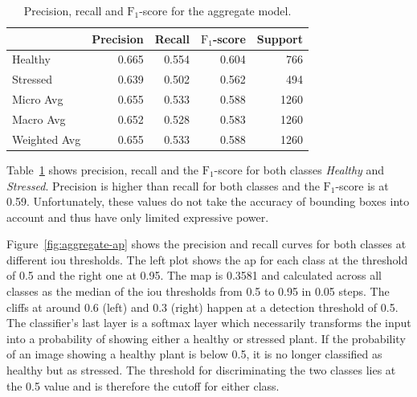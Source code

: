 \documentclass[final]{vutinfth} %
\begin{document}
\begin{table}
  \centering
  \begin{tabular}{lrrrr}
    \toprule
    {} &  Precision &  Recall &  $\mathrm{F}_{1}$-score &  Support \\
    \midrule
    Healthy      &      \num{0.665} &   \num{0.554} &     \num{0.604} &    \num{766} \\
    Stressed     &      \num{0.639} &   \num{0.502} &     \num{0.562} &    \num{494} \\
    Micro Avg    &      \num{0.655} &   \num{0.533} &     \num{0.588} &   \num{1260} \\
    Macro Avg    &      \num{0.652} &   \num{0.528} &     \num{0.583} &   \num{1260} \\
    Weighted Avg &      \num{0.655} &   \num{0.533} &     \num{0.588} &   \num{1260} \\
    \bottomrule
  \end{tabular}
  \caption{Precision, recall and $\mathrm{F}_1$-score for the
    aggregate model.}
  \label{tab:model-metrics}
\end{table}

Table~\ref{tab:model-metrics} shows precision, recall and the
$\mathrm{F}_1$-score for both classes \emph{Healthy} and
\emph{Stressed}. Precision is higher than recall for both classes and
the $\mathrm{F}_1$-score is at \num{0.59}. Unfortunately, these values
do not take the accuracy of bounding boxes into account and thus have
only limited expressive power.

Figure~\ref{fig:aggregate-ap} shows the precision and recall curves
for both classes at different \gls{iou} thresholds. The left plot
shows the \gls{ap} for each class at the threshold of \num{0.5} and
the right one at \num{0.95}. The \gls{map} is \num{0.3581} and
calculated across all classes as the median of the \gls{iou}
thresholds from \num{0.5} to \num{0.95} in \num{0.05} steps. The
cliffs at around \num{0.6} (left) and \num{0.3} (right) happen at a
detection threshold of \num{0.5}. The classifier's last layer is a
softmax layer which necessarily transforms the input into a
probability of showing either a healthy or stressed plant. If the
probability of an image showing a healthy plant is below \num{0.5}, it
is no longer classified as healthy but as stressed. The threshold for
discriminating the two classes lies at the \num{0.5} value and is
therefore the cutoff for either class.
\end{document}
